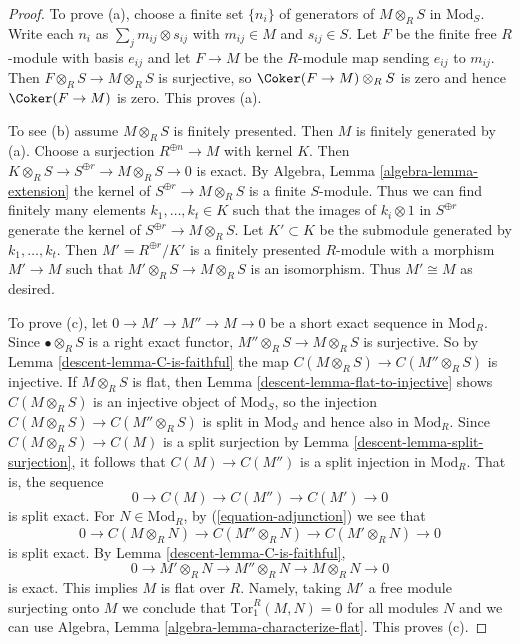 \begin{proof}

To prove (a), choose a finite set $\{n_i\}$ of generators of $M \otimes_R S$
in $\text{Mod}_S$. Write each $n_i$ as $\sum_j m_{ij} \otimes s_{ij}$ with
$m_{ij} \in M$ and $s_{ij} \in S$. Let $F$ be the finite free $R$-module with
basis $e_{ij}$ and let $F \to M$ be the $R$-module map sending $e_{ij}$ to
$m_{ij}$. Then $F \otimes_R S\to M \otimes_R S$ is surjective, so
$\Coker(F \to M) \otimes_R S$ is zero and hence $\Coker(F \to M)$
is zero. This proves (a).

\medskip\noindent
To see (b) assume $M \otimes_R S$ is finitely presented. Then $M$ is finitely
generated by (a). Choose a surjection $R^{\oplus n} \to M$ with kernel $K$.
Then $K \otimes_R S \to S^{\oplus r} \to M \otimes_R S \to 0$ is exact.
By Algebra, Lemma \ref{algebra-lemma-extension}
the kernel of $S^{\oplus r} \to M \otimes_R S$
is a finite $S$-module. Thus we can find finitely many elements
$k_1, \ldots, k_t \in K$ such that the images of $k_i \otimes 1$ in
$S^{\oplus r}$ generate the kernel of $S^{\oplus r} \to M \otimes_R S$.
Let $K' \subset K$ be the submodule generated by $k_1, \ldots, k_t$.
Then $M' = R^{\oplus r}/K'$ is a finitely presented $R$-module
with a morphism $M' \to M$ such that $M' \otimes_R S \to M \otimes_R S$
is an isomorphism. Thus $M' \cong M$ as desired.

\medskip\noindent
To prove (c), let $0 \to M' \to M'' \to M \to 0$ be a short exact sequence in
$\text{Mod}_R$. Since $\bullet \otimes_R S$ is a right exact functor,
$M'' \otimes_R S \to M \otimes_R S$ is surjective. So by
Lemma \ref{descent-lemma-C-is-faithful} the map
$C(M \otimes_R S) \to C(M'' \otimes_R S)$ is injective.
If $M \otimes_R S$ is flat, then
Lemma \ref{descent-lemma-flat-to-injective} shows
$C(M \otimes_R S)$ is an injective object of $\text{Mod}_S$, so the injection
$C(M \otimes_R S) \to C(M'' \otimes_R S)$
is split in $\text{Mod}_S$ and hence also in $\text{Mod}_R$.
Since $C(M \otimes_R S) \to C(M)$ is a split surjection by
Lemma \ref{descent-lemma-split-surjection}, it follows that
$C(M) \to C(M'')$ is a split injection in $\text{Mod}_R$. That is, the sequence
$$
0 \to C(M) \to C(M'') \to C(M') \to 0
$$
is split exact.
For $N \in \text{Mod}_R$, by (\ref{equation-adjunction}) we see that
$$
0 \to C(M \otimes_R N) \to C(M'' \otimes_R N) \to C(M' \otimes_R N) \to 0
$$
is split exact. By Lemma \ref{descent-lemma-C-is-faithful},
$$
0 \to M' \otimes_R N \to M'' \otimes_R N \to M \otimes_R N \to 0
$$
is exact. This implies $M$ is flat over $R$. Namely, taking
$M'$ a free module surjecting onto $M$ we conclude that
$\text{Tor}_1^R(M, N) = 0$ for all modules $N$ and we can use
Algebra, Lemma \ref{algebra-lemma-characterize-flat}.
This proves (c).


\end{proof}
